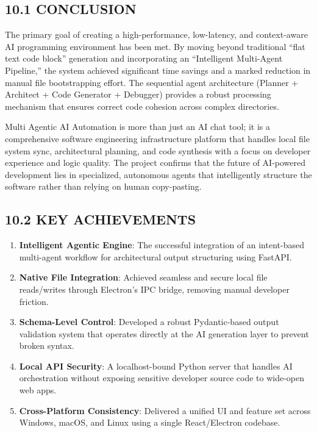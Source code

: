 \documentclass[
  12pt,
]{article}
\providecommand{\tightlist}{%
  \setlength{\itemsep}{0pt}\setlength{\parskip}{0pt}}
\begin{document}
\subsection{10.1 CONCLUSION}\label{conclusion}

The primary goal of creating a high-performance, low-latency, and
context-aware AI programming environment has been met. By moving beyond
traditional ``flat text code block'' generation and incorporating an
``Intelligent Multi-Agent Pipeline,'' the system achieved significant
time savings and a marked reduction in manual file bootstrapping effort.
The sequential agent architecture (Planner + Architect + Code Generator
+ Debugger) provides a robust processing mechanism that ensures correct
code cohesion across complex directories.

Multi Agentic AI Automation is more than just an AI chat tool; it is a
comprehensive software engineering infrastructure platform that handles
local file system sync, architectural planning, and code synthesis with
a focus on developer experience and logic quality. The project confirms
that the future of AI-powered development lies in specialized,
autonomous agents that intelligently structure the software rather than
relying on human copy-pasting.

\subsection{10.2 KEY ACHIEVEMENTS}\label{key-achievements}

\begin{enumerate}
\def\labelenumi{\arabic{enumi}.}
\tightlist
\item
  \textbf{Intelligent Agentic Engine}: The successful integration of an
  intent-based multi-agent workflow for architectural output structuring
  using FastAPI.
\item
  \textbf{Native File Integration}: Achieved seamless and secure local
  file reads/writes through Electron's IPC bridge, removing manual
  developer friction.
\item
  \textbf{Schema-Level Control}: Developed a robust Pydantic-based
  output validation system that operates directly at the AI generation
  layer to prevent broken syntax.
\item
  \textbf{Local API Security}: A localhost-bound Python server that
  handles AI orchestration without exposing sensitive developer source
  code to wide-open web apps.
\item
  \textbf{Cross-Platform Consistency}: Delivered a unified UI and
  feature set across Windows, macOS, and Linux using a single
  React/Electron codebase.
\end{enumerate}
\end{document}
